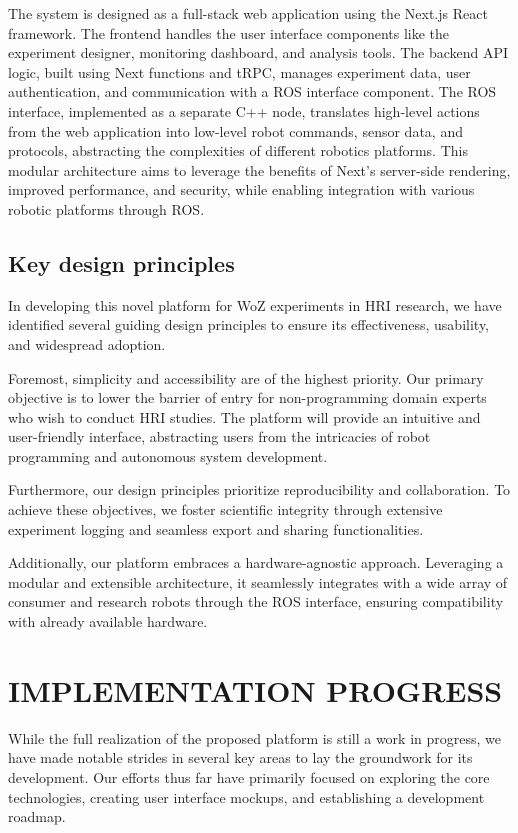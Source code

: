\documentclass[letterpaper, 10 pt, conference]{ieeeconf}
\begin{document}
The system is designed as a full-stack web application using the Next.js React framework. The frontend handles the user interface components like the experiment designer, monitoring dashboard, and analysis tools. The backend API logic, built using Next functions and tRPC, manages experiment data, user authentication, and communication with a ROS interface component. The ROS interface, implemented as a separate C++ node, translates high-level actions from the web application into low-level robot commands, sensor data, and protocols, abstracting the complexities of different robotics platforms. This modular architecture aims to leverage the benefits of Next's server-side rendering, improved performance, and security, while enabling integration with various robotic platforms through ROS.

\subsection{Key design principles}

In developing this novel platform for WoZ experiments in HRI research, we have identified several guiding design principles to ensure its effectiveness, usability, and widespread adoption.

Foremost, simplicity and accessibility are of the highest priority. Our primary objective is to lower the barrier of entry for non-programming domain experts who wish to conduct HRI studies. The platform will provide an intuitive and user-friendly interface, abstracting users from the intricacies of robot programming and autonomous system development. 

Furthermore, our design principles prioritize reproducibility and collaboration. To achieve these objectives, we foster scientific integrity through extensive experiment logging and seamless export and sharing functionalities.

Additionally, our platform embraces a hardware-agnostic approach. Leveraging a modular and extensible architecture, it seamlessly integrates with a wide array of consumer and research robots through the ROS interface, ensuring compatibility with already available hardware.

\section{IMPLEMENTATION PROGRESS}

While the full realization of the proposed platform is still a work in progress, we have made notable strides in several key areas to lay the groundwork for its development. Our efforts thus far have primarily focused on exploring the core technologies, creating user interface mockups, and establishing a development roadmap.
\end{document}
